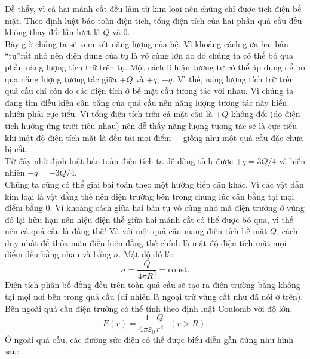 \begin{loigiai}
\begin{enumerate}[1)]
\begin{center}
\begin{tikzpicture}[x=0.75pt,y=0.75pt,yscale=-1,xscale=1]
    
    \end{tikzpicture}
    \end{center}
    Dễ thấy, vì cả hai mảnh cắt đều làm từ kim loại nên chúng chỉ được tích điện bề mặt. Theo định luật bảo toàn điện tích, tổng điện tích của hai phần quả cầu đều không thay đổi lần lượt là $Q$ và $0$.\\
    Bây giờ chúng ta sẽ xem xét năng lượng của hệ. Vì khoảng cách giữa hai bản ``tụ''rất nhỏ nên điện dung của tụ là vô cùng lớn do đó chúng ta có thể bỏ qua phần năng lượng tích trữ trên tụ. Một cách lí luận tương tự có thể áp dụng để bỏ qua năng lượng tương tác giữa $+Q$ và $+q$, $-q$. Vì thế, năng lượng tích trữ trên quả cầu chỉ còn do các điện tích ở bề mặt cầu tương tác với nhau. Vì chúng ta đang tìm điều kiện cân bằng của quả cầu nên năng lượng tương tác này hiển nhiên phải cực tiểu. Vì tổng điện tích trên cả mặt cầu là  $+Q$ không đổi (do điện tích hưởng ứng triệt tiêu nhau) nên dễ thấy năng lượng tương tác sẽ là cực tiểu khi mật độ điện tích mặt là đều tại mọi điểm $-$ giống như một quả cầu đặc chưa bị cắt.\\
    Từ đây nhờ định luật bảo toàn điện tích ta dễ dàng tính được $+q= 3Q/4$ và hiển nhiên $-q=-3Q/4.$\\
    Chúng ta cũng có thể giải bài toán theo một hướng tiếp cận khác. Vì các vật dẫn kim loại là vật đẳng thế nên điện trường bên trong chúng lúc cân bằng tại mọi điểm bằng $0$. Vì khoảng cách giữa hai bản tụ vô cùng nhỏ mà điện trường ở vùng đó lại hữu hạn nên hiệu điện thế giữa hai mảnh cắt có thể được bỏ qua, vì thế nên cả quả cầu là đẳng thế! Và với một quả cầu mang điện tích bề mặt $Q$, cách duy nhất để thỏa mãn điều kiện đẳng thế chính là mật độ điện tích mặt mọi điểm đều bằng nhau và bằng $\sigma$. Mật độ đó là:
    $$\sigma= \dfrac{Q}{4\pi R^2} = \text{const}.$$
    Điện tích phân bố đồng đều trên toàn quả cầu sẽ tạo ra điện trường bằng không tại mọi nơi bên trong quả cầu (dĩ nhiên là ngoại trừ vùng cắt như đã nói ở trên). Bên ngoài quả cầu điện trường có thể tính theo định luật Coulomb với độ lớn:
    $$E(r)=\dfrac{1}{4\pi \varepsilon_0}\dfrac{Q}{r^2}~~~(r>R).$$
    Ở ngoài quả cầu, các đường sức điện có thể được biểu diễn gần đúng như hình sau:
    \begin{center}
            
    
    \begin{tikzpicture}[x=0.75pt,y=0.75pt,yscale=-0.6,xscale=0.6]
    

\end{tikzpicture}
\end{center}
\end{enumerate}
\end{loigiai}
